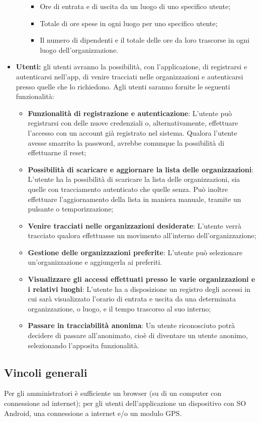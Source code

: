 \begin{itemize}
\begin{itemize}
    \begin{itemize}
    \item
      Ore di entrata e di uscita da un luogo di uno specifico utente;
    \item
      Totale di ore spese in ogni luogo per uno specifico utente;
    \item
      Il numero di dipendenti e il totale delle ore da loro trascorse in
      ogni luogo dell'organizzazione.
    \end{itemize}
  \end{itemize}
\item
  \textbf{Utenti:} gli utenti avranno la possibilità, con
  l'applicazione, di registrarsi e autenticarsi nell'app, di venire
  tracciati nelle organizzazioni e autenticarsi presso quelle che lo
  richiedono. Agli utenti saranno fornite le seguenti funzionalità:

  \begin{itemize}
  \item
    \textbf{Funzionalità di registrazione e autenticazione}: L'utente
    può registrarsi con delle nuove credenziali o, alternativamente,
    effettuare l'accesso con un account già registrato nel sistema.
    Qualora l'utente avesse smarrito la password, avrebbe comunque la
    possibilità di effettuarne il reset;
  \item
    \textbf{Possibilità di scaricare e aggiornare la lista delle
    organizzazioni}: L'utente ha la possibilità di scaricare la lista
    delle organizzazioni, sia quelle con tracciamento autenticato che
    quelle senza. Può inoltre effettuare l'aggiornamento della lista in
    maniera manuale, tramite un pulsante o temporizzazione;
  \item
    \textbf{Venire tracciati nelle organizzazioni desiderate}: L'utente
    verrà tracciato qualora effettuasse un movimento all'interno
    dell'organizzazione;
  \item
    \textbf{Gestione delle organizzazioni preferite}: L'utente può
    selezionare un'organizzazione e aggiungerla ai preferiti.
  \item
    \textbf{Visualizzare gli accessi effettuati presso le varie
    organizzazioni e i relativi luoghi}: L'utente ha a disposizione un
    registro degli accessi in cui sarà visualizzato l'orario di entrata
    e uscita da una determinata organizzazione, o luogo, e il tempo
    trascorso al suo interno;
  \item
    \textbf{Passare in tracciabilità anonima}: Un utente riconosciuto
    potrà decidere di passare all'anonimato, cioè di diventare un utente
    anonimo, selezionando l'apposita funzionalità.
  \end{itemize}
\end{itemize}
\subsection{Vincoli generali}
Per gli amministratori è sufficiente un browser (su di un computer con connessione ad internet); per gli utenti dell'applicazione un dispositivo con SO Android, una connessione a internet e/o un modulo GPS.